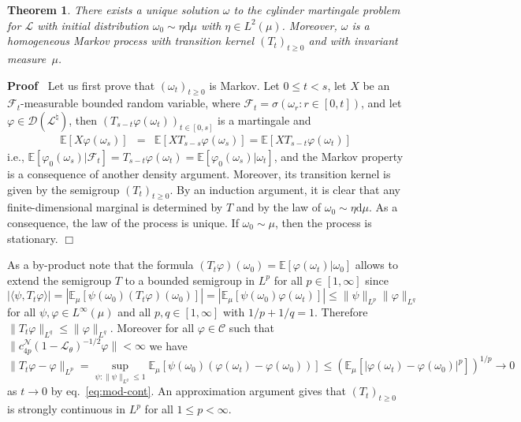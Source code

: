 \documentclass[10pt]{article}
\newcommand{\mathd}{\mathrm{d}}
\newcommand{\nobracket}{}
\newenvironment{proof}{\noindent\textbf{Proof\ }}{\hspace*{\fill}$\Box$\medskip}
\newtheorem{theorem}{Theorem}
\begin{document}
\begin{theorem}
  \label{thm:unique-mart}There exists a unique solution $\omega$ to the
  cylinder martingale problem for $\mathcal{L}$ with initial distribution
  $\omega_0 \sim \eta \mathd \mu$ with $\eta \in L^2 (\mu)$. Moreover,
  $\omega$ is a homogeneous Markov process with transition kernel $(T_t)_{t
  \geqslant 0}$ and with invariant measure~$\mu$.
\end{theorem}

\begin{proof}
  Let us first prove that $(\omega_t)_{t \geqslant 0}$ is Markov. Let $0
  \leqslant t < s$, let $X$ be an $\mathcal{F}_t$-measurable bounded random
  variable, where $\mathcal{F}_t = \sigma (\omega_r : r \in [0, t])$, and let
  $\varphi \in \mathcal{D} (\mathcal{L}^{\natural})$, then $(T_{s - t} \varphi
  (\omega_t))_{t \in [0, s]}$ is a martingale and
  \[ \begin{array}{lll}
       \mathbb{E} [X \varphi (\omega_s)] & = & \mathbb{E} [X T_{s - s} \varphi
       (\omega_s)] =\mathbb{E} [X T_{s - t} \varphi (\omega_t)]
     \end{array} \]
  i.e., $\mathbb{E} [\varphi_0 (\omega_s) | \mathcal{F}_t \nobracket] = T_{s -
  t} \varphi (\omega_t) =\mathbb{E} [\varphi_0 (\omega_s) | \omega_t
  \nobracket]$, and the Markov property is a consequence of another density
  argument. Moreover, its transition kernel is given by the semigroup
  $(T_t)_{t \geqslant 0}$. By an induction argument, it is clear that any
  finite-dimensional marginal is determined by $T$ and by the law of $\omega_0
  \sim \eta \mathd \mu$. As a consequence, the law of the process is unique.
  If $\omega_0 \sim \mu$, then the process is stationary.
\end{proof}

\begin{remark}
  As a by-product note that the formula $(T_t \varphi) (\omega_0) =\mathbb{E}
  [\varphi (\omega_t) | \omega_0]$ allows to extend the semigroup $T$ to a
  bounded semigroup in $L^p$ for all $p \in [1, \infty]$ since
  \[ | \langle \psi, T_t \varphi \rangle | = | \mathbb{E}_{\mu} [\psi
     (\omega_0) (T_t \varphi) (\omega_0)] | = | \mathbb{E}_{\mu} [\psi
     (\omega_0) \varphi (\omega_t)] | \leqslant \| \psi \|_{L^p} \| \varphi
     \|_{L^q} \]
  for all $\psi, \varphi \in L^{\infty} (\mu)$ and all $p, q \in [1, \infty]$
  with $1 / p + 1 / q = 1$. Therefore $\| T_t \varphi \|_{L^q} \leqslant \|
  \varphi \|_{L^q}$. Moreover for all $\varphi \in \mathcal{C}$ such that $\|
  c_{4 p}^{\mathcal{N}} (1 -\mathcal{L}_{\theta})^{- 1 / 2} \varphi \| <
  \infty$ we have
  \[ \| T_t \varphi - \varphi \|_{L^p} = \sup_{\psi : \| \psi \|_{L^q}
     \leqslant 1} \mathbb{E}_{\mu} [\psi (\omega_0) (\varphi (\omega_t) -
     \varphi (\omega_0))] \leqslant (\mathbb{E}_{\mu} [| \varphi (\omega_t) -
     \varphi (\omega_0) |^p])^{1 / p} \rightarrow 0 \]
  as $t \rightarrow 0$ by eq.~{\eqref{eq:mod-cont}}. An approximation argument
  gives that $(T_t)_{t \geqslant 0}$ is strongly continuous in $L^p$ for all
  $1 \leqslant p < \infty$.
\end{remark}
\end{document}
